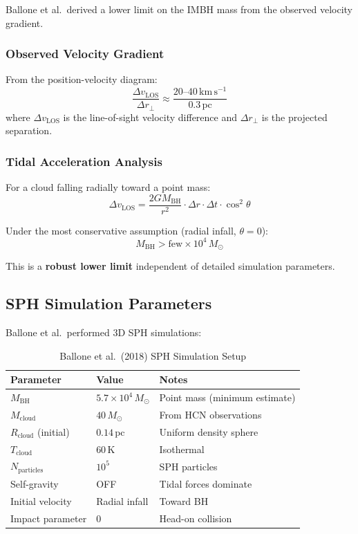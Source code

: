 \documentclass[11pt,a4paper]{article}
\newcommand{\Msun}{M_\odot}
\newcommand{\kms}{\,\mathrm{km\,s^{-1}}}
\newcommand{\pc}{\,\mathrm{pc}}
\begin{document}
Ballone et al.~derived a lower limit on the IMBH mass from the observed velocity gradient.

\subsubsection{Observed Velocity Gradient}
From the position-velocity diagram:
\begin{equation}
    \frac{\Delta v_\mathrm{LOS}}{\Delta r_\perp} \approx \frac{20\text{--}40\kms}{0.3\pc}
\end{equation}
where $\Delta v_\mathrm{LOS}$ is the line-of-sight velocity difference and $\Delta r_\perp$ is the projected separation.

\subsubsection{Tidal Acceleration Analysis}
For a cloud falling radially toward a point mass:
\begin{equation}
    \Delta v_\mathrm{LOS} = \frac{2 G M_\mathrm{BH}}{r^2} \cdot \Delta r \cdot \Delta t \cdot \cos^2\theta
\end{equation}

Under the most conservative assumption (radial infall, $\theta = 0$):
\begin{equation}
    M_\mathrm{BH} > \text{few} \times 10^4\,\Msun
\end{equation}

This is a \textbf{robust lower limit} independent of detailed simulation parameters.

\subsection{SPH Simulation Parameters}

Ballone et al.~performed 3D SPH simulations:

\begin{table}[h]
\centering
\caption{Ballone et al.~(2018) SPH Simulation Setup}
\begin{tabular}{lll}
\toprule
\textbf{Parameter} & \textbf{Value} & \textbf{Notes} \\
\midrule
$M_\mathrm{BH}$ & $5.7 \times 10^4\,\Msun$ & Point mass (minimum estimate) \\
$M_\mathrm{cloud}$ & $40\,\Msun$ & From HCN observations \\
$R_\mathrm{cloud}$ (initial) & $0.14\pc$ & Uniform density sphere \\
$T_\mathrm{cloud}$ & $60\,\mathrm{K}$ & Isothermal \\
$N_\mathrm{particles}$ & $10^5$ & SPH particles \\
Self-gravity & OFF & Tidal forces dominate \\
Initial velocity & Radial infall & Toward BH \\
Impact parameter & 0 & Head-on collision \\
\bottomrule
\end{tabular}
\end{table}
\end{document}
